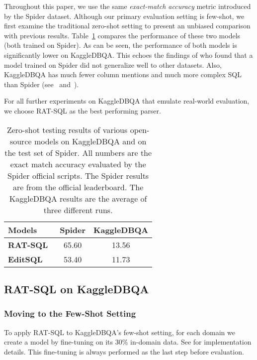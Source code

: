 \documentclass[11pt,a4paper]{article}
\newcommand{\systemname}{\mbox{KaggleDBQA}\xspace}
\begin{document}
Throughout this paper, we use the same \textit{exact-match accuracy} metric introduced by the Spider dataset.
Although our primary evaluation setting is few-shot, we first examine the traditional zero-shot setting to
present an unbiased comparison with previous results.
Table~\ref{tab:sota} compares the performance of these two models (both trained on Spider).
As can be seen, the performance of both models is significantly lower on \systemname.
This echoes the findings of \citet{suhr2020exploring} who found that a model trained on Spider did not generalize well to other datasets.
Also, \systemname has much fewer column mentions and much more complex SQL than Spider (see~ and~).

For all further experiments on \systemname that emulate real-world evaluation, we choose RAT-SQL as the best performing
parser.




\begin{table}[t]
    \setlength{\tabcolsep}{5pt}
    \centering
    \small
    \caption{Zero-shot testing results of various open-source models on \systemname and on the test set of Spider. All
        numbers are the exact match accuracy evaluated by the Spider official scripts. The Spider results are from the
        official leaderboard. The \systemname results are the average of three different runs.
    }
    \label{tab:sota}
    \begin{tabular}{lcc}
        \toprule
        \textbf{Models}  & \textbf{Spider} &  \textbf{\systemname} \\
        \midrule
        \textbf{RAT-SQL}~\cite{wang-etal-2020-rat}  & 65.60  & 13.56  \\
        \textbf{EditSQL}~\cite{editsql} &  53.40 & 11.73  \\
        \bottomrule
    \end{tabular}
\end{table}

\subsection{RAT-SQL on \systemname}

\subsubsection{Moving to the Few-Shot Setting}
To apply RAT-SQL to \systemname's few-shot setting, for each domain we create a model by fine-tuning on its 30\%
in-domain data.
See  for implementation details.
This fine-tuning is always performed as the last step before evaluation. 
\end{document}
